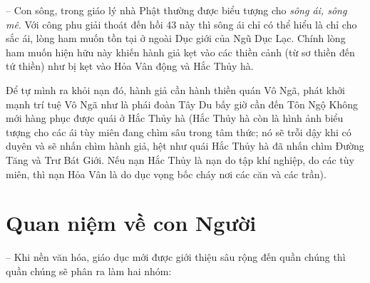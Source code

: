 -- Con sông, trong giáo lý nhà Phật thường được biểu tượng cho \emph{sông ái, sông mê}. Với công phu giải thoát đến hồi 43 này thì sông ái chỉ có thể hiểu là chỉ cho sắc ái, lòng ham muốn tồn tại ở ngoài Dục giới của Ngũ Dục Lạc. Chính lòng ham muốn hiện hữu này khiến hành giả kẹt vào các thiền cảnh (từ sơ thiền đến tứ thiền) như bị kẹt vào Hỏa Vân động và Hắc Thủy hà.

Để tự mình ra khỏi nạn đó, hành giả cần hành thiền quán Vô Ngã, phát khởi mạnh trí tuệ Vô Ngã như là phái đoàn Tây Du bấy giờ cần đến Tôn Ngộ Không mới hàng phục được quái ở Hắc Thủy hà (Hắc Thủy hà còn là hình ảnh biểu tượng cho các ái tùy miên đang chìm sâu trong tâm thức; nó sẽ trỗi dậy khi có duyên và sẽ nhấn chìm hành giả, hệt như quái Hắc Thủy hà đã nhấn chìm Đường Tăng và Trư Bát Giới. Nếu nạn Hắc Thủy là nạn do tập khí nghiệp, do các tùy miên, thì nạn Hỏa Vân là do dục vọng bốc cháy nơi các căn và các trần).

\section{Quan niệm về con Người} %
\label{sec:43_con_nguoi}

-- Khi nền văn hóa, giáo dục mới được giới thiệu sâu rộng đến quần chúng thì quần chúng sẽ phân ra làm hai nhóm:

